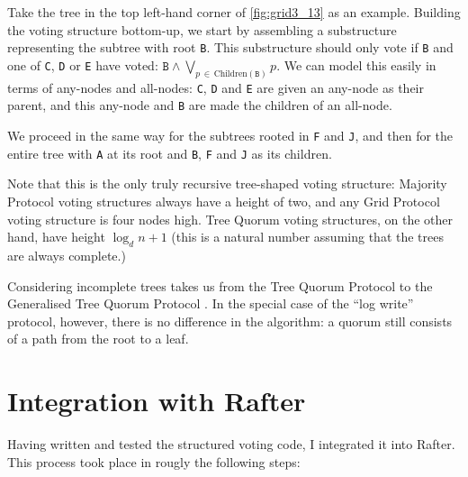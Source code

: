 \documentclass[11pt,chapterprefix=true,toc=bibliography,numbers=noendperiod,
               footnotes=multiple,twoside]{scrreprt}
\begin{document}
Take the tree in the top left-hand corner of \cref{fig:grid3_13} as an example. Building the voting structure bottom-up, we start by assembling a substructure representing the subtree with root \texttt{B}. This substructure should only vote if \texttt{B} and one of \texttt{C}, \texttt{D} or \texttt{E} have voted: \( \texttt{B} \wedge \bigvee_{p\,\in\,\text{Children}(\texttt{B})} p \). We can model this easily in terms of any-nodes and all-nodes: \texttt{C}, \texttt{D} and \texttt{E} are given an any-node as their parent, and this any-node and \texttt{B} are made the children of an all-node.

We proceed in the same way for the subtrees rooted in \texttt{F} and \texttt{J}, and then for the entire tree with \texttt{A} at its root and \texttt{B}, \texttt{F} and \texttt{J} as its children.

Note that this is the only truly recursive tree-shaped voting structure: Majority Protocol voting structures always have a height of two, and any Grid Protocol voting structure is four nodes high. Tree Quorum voting structures, on the other hand, have height \(\log_d{n+1}\) (this is a natural number assuming that the trees are always complete.)


Considering incomplete trees takes us from the Tree Quorum Protocol to the Generalised Tree Quorum Protocol \autocite{gen-tree}. In the special case of the \enquote{log write} protocol, however, there is no difference in the algorithm: a quorum still consists of a path from the root to a leaf.

\section{Integration with Rafter\label{sc:rafter-integration}}

Having written and tested the structured voting code, I integrated it into Rafter. This process took place in rougly the following steps:
\end{document}
